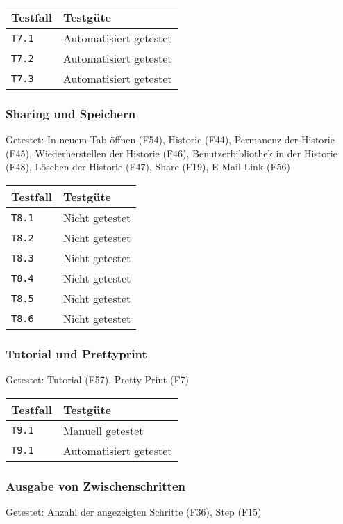 \documentclass[parskip=full,11pt,twoside]{scrartcl}
\newcommand{\testline}[2]{
    \texttt{#1} & 
    \ifthenelse{\equal{#2}{Nicht getestet}}
        {\cellcolor{red!20}}
        {}
    \ifthenelse{\equal{#2}{Manuell getestet}}
        {\cellcolor{LimeGreen!20}}
        {}
    \ifthenelse{\equal{#2}{Automatisiert getestet}}
        {\cellcolor{green!20}}
        {}
    #2 \\ \hline
}
\begin{document}
    \label{shortcuts}
    \begin{center}
        \begin{tabular}{ p{9cm} p{4cm}}
            Testfall & Testgüte \\ \hline
            \testline{T7.1}{Automatisiert getestet}
            \testline{T7.2}{Automatisiert getestet}
            \testline{T7.3}{Automatisiert getestet}
        \end{tabular}
    \end{center}

\subsubsection{Sharing und Speichern}
    Getestet:
    In neuem Tab öffnen (F54),
    Historie (F44),
    Permanenz der Historie (F45),
    Wiederherstellen der Historie (F46),
    Benutzerbibliothek in der Historie (F48),
    Löschen der Historie (F47),
    Share (F19),
    E-Mail Link (F56)

    \label{shortcuts}
    \begin{center}
        \begin{tabular}{ p{9cm} p{4cm}}
            Testfall & Testgüte \\ \hline
            \testline{T8.1}{Nicht getestet}
            \testline{T8.2}{Nicht getestet}
            \testline{T8.3}{Nicht getestet}
            \testline{T8.4}{Nicht getestet}
            \testline{T8.5}{Nicht getestet}
            \testline{T8.6}{Nicht getestet}
        \end{tabular}
    \end{center}

\subsubsection{Tutorial und Prettyprint}
    Getestet:
    Tutorial (F57),
    Pretty Print (F7)

    \label{shortcuts}
    \begin{center}
        \begin{tabular}{ p{9cm} p{4cm}}
            Testfall & Testgüte \\ \hline
            \testline{T9.1}{Manuell getestet}
            \testline{T9.1}{Automatisiert getestet}
        \end{tabular}
    \end{center}

\subsubsection{Ausgabe von Zwischenschritten}
    Getestet:
    Anzahl der angezeigten Schritte (F36),
    Step (F15)
\end{document}
